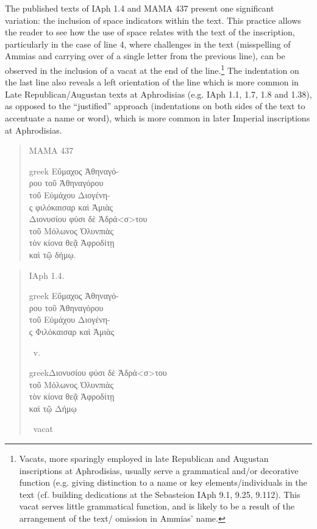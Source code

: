 \documentclass[amsthm,ebook]{saparticle}
\begin{document}
The published texts of IAph 1.4 and MAMA 437 present one significant variation: the inclusion of space indicators within
the text. This practice allows the reader to see how the use of space relates with the text of the inscription,
particularly in the case of line 4, where challenges in the text (misspelling of Ammias and carrying over of a single
letter from the previous line), can be observed in the inclusion of a vacat at the end of the line.\footnote{ Vacats,
more sparingly employed in late Republican and Augustan inscriptions at Aphrodisias, usually serve a grammatical and/or
decorative function (e.g. giving distinction to a name or key elements/individuals in the text (cf. building
dedications at the Sebasteion IAph 9.1, 9.25, 9.112). This vacat serves little grammatical function, and is likely to
be a result of the arrangement of the text/ omission in Ammias’ name. } The indentation on the last line also reveals
a left orientation of the line which is more common in Late Republican/Augustan texts at Aphrodisias (e.g. IAph 1.1,
1.7, 1.8 and 1.38), as opposed to the ``justified'' approach (indentations on both sides of the text to accentuate a name
or word), which is more common in later Imperial inscriptions at Aphrodisias. 

\begin{quotation}
\noindent MAMA 437\\
\begin{otherlanguage*}{greek}
\noindent Εὔμαχος Ἀθηναγό-\\
ρου τοῦ Ἀθηναγόρου\\
τοῦ Εὐμάχου Διογένη-\\
ς φιλόκαισαρ καὶ Ἀμιὰς\\
Διονυσίου φύσι δὲ Ἀδρά<σ>του\\
τοῦ Μόλωνος Ὀλυνπιὰς\\
τὸν κίονα θεᾷ Ἀφροδίτῃ\\
καὶ τῷ δήμῳ.
\end{otherlanguage*}

\end{quotation}
\begin{quotation}
\noindent IAph 1.4.\\
\begin{otherlanguage*}{greek}
\noindent Εὔμαχος Ἀθηναγό-\\
ρου τοῦ Ἀθηναγόρου\\
τοῦ Εὐμάχου Διογένη-\\
ς Φιλόκαισαρ καὶ Ἀμιὰς\end{otherlanguage*} v.\\
\begin{otherlanguage*}{greek}Διονυσίου φύσι δὲ Ἀδρά<σ>του\\
τοῦ Μόλωνος Ὀλυνπιὰς\\
τὸν κίονα θεᾷ Ἀφροδίτῃ\\
καὶ τῷ Δήμῳ
\end{otherlanguage*} vacat
\end{quotation}
\end{document}
